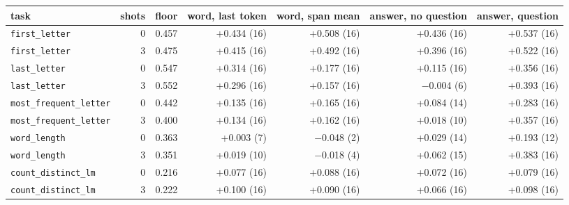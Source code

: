 \begin{tabular}{@{}lrrrrrr@{}}
\toprule
task & shots & floor & word, last token & word, span mean & answer, no question & answer, question \\
\midrule
\texttt{first\_letter} & 0 & 0.457 & +0.434 (16) & +0.508 (16) & +0.436 (16) & +0.537 (16) \\
\texttt{first\_letter} & 3 & 0.475 & +0.415 (16) & +0.492 (16) & +0.396 (16) & +0.522 (16) \\
\addlinespace[2pt]
\texttt{last\_letter} & 0 & 0.547 & +0.314 (16) & +0.177 (16) & +0.115 (16) & +0.356 (16) \\
\texttt{last\_letter} & 3 & 0.552 & +0.296 (16) & +0.157 (16) & $-$0.004 (6) & +0.393 (16) \\
\addlinespace[2pt]
\texttt{most\_frequent\_letter} & 0 & 0.442 & +0.135 (16) & +0.165 (16) & +0.084 (14) & +0.283 (16) \\
\texttt{most\_frequent\_letter} & 3 & 0.400 & +0.134 (16) & +0.162 (16) & +0.018 (10) & +0.357 (16) \\
\addlinespace[2pt]
\texttt{word\_length} & 0 & 0.363 & +0.003 (7) & $-$0.048 (2) & +0.029 (14) & +0.193 (12) \\
\texttt{word\_length} & 3 & 0.351 & +0.019 (10) & $-$0.018 (4) & +0.062 (15) & +0.383 (16) \\
\addlinespace[2pt]
\texttt{count\_distinct\_lm} & 0 & 0.216 & +0.077 (16) & +0.088 (16) & +0.072 (16) & +0.079 (16) \\
\texttt{count\_distinct\_lm} & 3 & 0.222 & +0.100 (16) & +0.090 (16) & +0.066 (16) & +0.098 (16) \\
\bottomrule
\end{tabular}